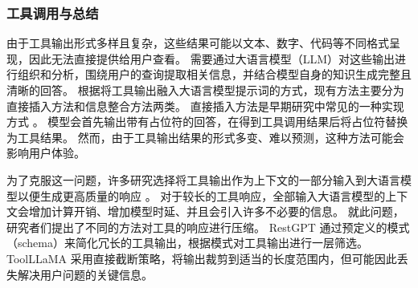 


\subsubsection{工具调用与总结}

由于工具输出形式多样且复杂，这些结果可能以文本、数字、代码等不同格式呈现，因此无法直接提供给用户查看。
需要通过大语言模型（LLM）对这些输出进行组织和分析，围绕用户的查询提取相关信息，并结合模型自身的知识生成完整且清晰的回答。
根据将工具输出融入大语言模型提示词的方式，现有方法主要分为直接插入方法和信息整合方法两类。
直接插入方法是早期研究中常见的一种实现方式 \cite{schick2024toolformer, wang2024tools, hao2024toolkengpt}。
模型会首先输出带有占位符的回答，在得到工具调用结果后将占位符替换为工具结果。
然而，由于工具输出结果的形式多变、难以预测，这种方法可能会影响用户体验。

为了克服这一问题，许多研究选择将工具输出作为上下文的一部分输入到大语言模型以便生成更高质量的响应 \cite{shen2024hugginggpt}。
对于较长的工具响应，全部输入大语言模型的上下文会增加计算开销、增加模型时延、并且会引入许多不必要的信息。
就此问题，研究者们提出了不同的方法对工具的响应进行压缩。
RestGPT \cite{Song2023} 通过预定义的模式（schema）来简化冗长的工具输出，根据模式对工具输出进行一层筛选。
ToolLLaMA \cite{Qin2023} 采用直接截断策略，将输出裁剪到适当的长度范围内，但可能因此丢失解决用户问题的关键信息。

